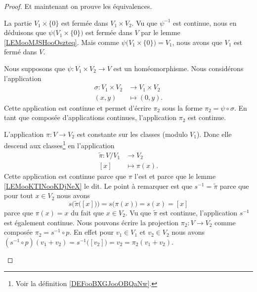 \begin{proof}
	Et maintenant on prouve les équivalences.
	\begin{subproof}
		La partie \( V_1\times \{ 0 \}\) est fermée dans \( V_1\times V_2\). Vu que \( \psi^{-1}\) est continue, nous en déduisons que \( \psi\big( V_1\times\{ 0 \} \big)\) est fermée dans \( V\) par le lemme \ref{LEMooMJSHooOszteq}. Mais comme \( \psi\big( V_1\times \{ 0 \} \big)=V_1\), nous avons que \( V_1\) est fermé dans \( V\).

		\spitem[\ref{ITEMooMUELooWdJQeW} \( \Rightarrow\) \ref{ITEMooFSSMooCQzTIc}]
		Nous supposons que \( \psi\colon V_1\times V_2\to V\) est un homéomorphisme. Nous considérons l'application
		\begin{equation}
			\begin{aligned}
				\sigma\colon V_1\times V_2 & \to V_1\times V_2 \\
				(x,y)                      & \mapsto (0,y).
			\end{aligned}
		\end{equation}
		Cette application est continue et permet d'écrire \( \pi_2\) sous la forme \( \pi_2=\psi\circ \sigma\). En tant que composée d'applications continues, l'application \( \pi_2\) est continue.

		\spitem[\ref{ITEMooFSSMooCQzTIc} \( \Rightarrow\) \ref{ITEMooDKOYooUpEfOR}]
		L'application \( \pi\colon V\to V_2\) est constante sur les classes (modulo \( V_1\)). Donc elle descend aux classes\footnote{Voir la définition \ref{DEFooBXGJooOBQaNw}.} en l'application
		\begin{equation}
			\begin{aligned}
				\tilde \pi\colon V/V_1 & \to V_2         \\
				[x]                    & \mapsto \pi(x).
			\end{aligned}
		\end{equation}
		Cette application est continue parce que \( \pi\) l'est et parce que le lemme \ref{LEMooKTINooKDjNeX} le dit. Le point à remarquer est que \( s^{-1}=\tilde \pi\) parce que pour tout \( x\in V_2\) nous avons
		\begin{equation}
			s\Big( \tilde \pi\big( [x] \big) \Big)=s\big( \pi(x) \big)=s(x)=[x]
		\end{equation}
		parce que \( \pi(x)=x\) du fait que \( x\in V_2\). Vu que \( \tilde \pi\) est continue, l'application \( s^{-1}\) est également continue.
		\spitem[\ref{ITEMooDKOYooUpEfOR} \( \Rightarrow\) \ref{ITEMooMUELooWdJQeW}]
		Nous pouvons écrire la projection \( \pi_2\colon V\to V_2\) comme composée \( \pi_2=s^{-1}\circ p\). En effet pour \( v_1\in V_1\) et \( v_2\in V_2\) nous avons \( (s^{-1}\circ p)(v_1+v_2)=s^{-1}\big( [v_2] \big)=v_2=\pi_2(v_1+v_2)\).


\end{subproof}
\end{proof}
